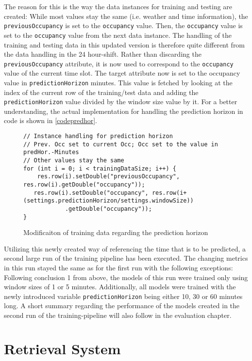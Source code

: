 The reason for this is the way the data instances for training and testing are created: While most values stay the same (i.e. weather and time information), the \texttt{previousOccupancy} is set to the \texttt{occupancy} value. Then, the \texttt{occupancy} value is set to the \texttt{occupancy} value from the next data instance. The handling of the training and testing data in this updated version is therefore quite different from the data handling in the 24 hour-shift. Rather than discarding the \texttt{previousOccupancy} attribute, it is now used to correspond to the \texttt{occupancy} value of the current time slot. The target attribute now is set to the occupancy value in \texttt{predictionHorizon} minutes. This value is fetched by looking at the index of the current row of the training/test data and adding the \texttt{predictionHorizon} value divided by the window size value by it. For a better understanding, the actual implementation for handling the prediction horizon in code is shown in \autoref{codepredhor}.


\begin{figure}
\begin{lstlisting}
// Instance handling for prediction horizon
// Prev. Occ set to current Occ; Occ set to the value in predHor.-Minutes 
// Other values stay the same
for (int i = 0; i < trainingDataSize; i++) {
	res.row(i).setDouble("previousOccupancy", res.row(i).getDouble("occupancy"));
   res.row(i).setDouble("occupancy", res.row(i+(settings.predictionHorizon/settings.windowSize))
            .getDouble("occupancy"));
}
\end{lstlisting}
\caption{Modificaiton of training data regarding the prediction horizon}
\label{codepredhor}
\end{figure}


Utilizing this newly created way of referencing the time that is to be predicted, a second large run of the training pipeline has been executed. The changing metrics in this run stayed the same as for the first run with the following exceptions: Following conclusion 1 from above, the models of this run were trained only using window sizes of 1 or 5 minutes. Additionally, all models were trained with the newly introduced variable \texttt{predictionHorizon} being either 10, 30 or 60 minutes long. A short summary regarding the performance of the models created in the second run of the training-pipeline will also follow in the evaluation chapter.



\section{Retrieval System}
 
